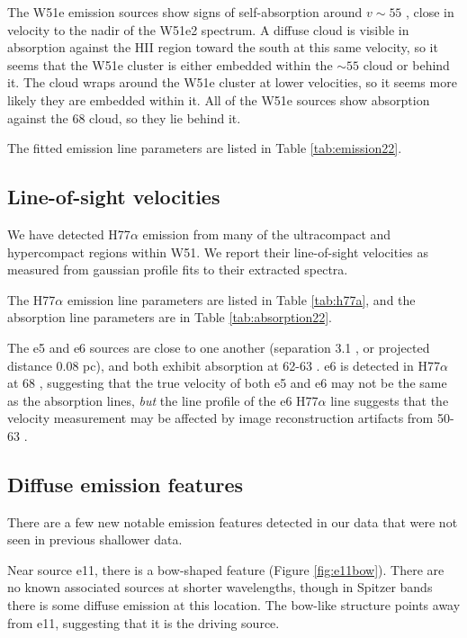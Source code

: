 The W51e emission sources show signs of self-absorption around $v\sim55$ \kms,
close in velocity to the nadir of the W51e2 spectrum.  A diffuse cloud is
visible in absorption against the HII region toward the south at this same
velocity, so it seems that the W51e cluster is either embedded within the
$\sim55$ \kms cloud or behind it.  The cloud wraps around the W51e cluster at
lower velocities, so it seems more likely they are embedded within it.  All of
the W51e sources show absorption against the 68 \kms cloud, so they lie behind
it.

The fitted emission line parameters are listed in Table \ref{tab:emission22}.



\subsection{Line-of-sight velocities}
\label{sec:LOSvelo}
We have detected H77$\alpha$ emission from many of the ultracompact and
hypercompact \hii regions within W51.  We report their line-of-sight velocities
as measured from gaussian profile fits to their extracted spectra.

The H77$\alpha$ emission line parameters are listed in Table \ref{tab:h77a}, and
the \para \twotwo absorption line parameters are in Table \ref{tab:absorption22}.

The e5 and e6 sources are close to one another (separation 3.1 \arcsec, or
projected distance 0.08 pc), and both exhibit \formaldehyde absorption at 62-63
\kms.  e6 is detected in H77$\alpha$ at 68 \kms, suggesting that the true
velocity of both e5 and e6 may not be the same as the \formaldehyde absorption
lines, \emph{but} the line profile of the e6 H77$\alpha$ line suggests that the
velocity measurement may be affected by image reconstruction artifacts from
50-63 \kms.





\subsection{Diffuse emission features}
\label{sec:diffuseemission}
There are a few new notable emission features detected in our data that were
not seen in previous shallower data.

Near source e11, there is a bow-shaped feature (Figure \ref{fig:e11bow}).
There are no known associated sources at shorter wavelengths, though in Spitzer
bands there is some diffuse emission at this location.  The bow-like structure
points away from e11, suggesting that it is the driving source.

